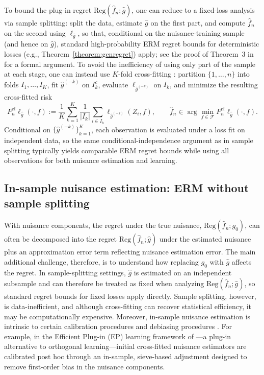 \documentclass[11pt]{article}
\newcommand{\Reg}{\mathrm{Reg}}
\theoremstyle{plain}
\theoremstyle{definition} %
\begin{document}
To bound the plug-in regret \(\Reg(\hat f_n;\hat g)\), one can reduce to a fixed-loss
analysis via sample splitting: split the data, estimate \(\hat g\) on the first
part, and compute \(\hat f_n\) on the second using \(\ell_{\hat g}\), so that,
conditional on the nuisance-training sample (and hence on \(\hat g\)), standard
high-probability ERM regret bounds for deterministic losses (e.g.,
Theorem~\ref{theorem:genregret}) apply; see the proof of Theorem~3 in
\cite{foster2023orthogonal} for a formal argument.  To avoid the inefficiency of using only
part of the sample at each stage, one can instead use $K$-fold cross-fitting
\citep{van2011cross, chernozhukov2018double}: partition $\{1,\ldots,n\}$ into
folds $I_1,\ldots,I_K$, fit $\hat g^{(-k)}$ on $I_k^c$, evaluate
$\ell_{\hat g^{(-k)}}$ on $I_k$, and minimize the resulting cross-fitted risk
\[
P_n^{\mathrm{cf}}\ell_{\hat g}(\cdot,f)
:=
\frac{1}{K}\sum_{k=1}^K \frac{1}{|I_k|}\sum_{i\in I_k} \ell_{\hat g^{(-k)}}(Z_i,f),
\qquad
\hat f_n \in \arg\min_{f\in\mathcal{F}} P_n^{\mathrm{cf}}\ell_{\hat g}(\cdot,f).
\]
Conditional on $\{\hat g^{(-k)}\}_{k=1}^K$, each observation is evaluated under a
loss fit on independent data, so the same conditional-independence argument as
in sample splitting typically yields comparable ERM regret bounds while using
all observations for both nuisance estimation and learning.


\subsection{In-sample nuisance estimation: ERM without sample splitting}
\label{sec:insample}
With nuisance components, the regret under the true nuisance,
\(\Reg(\hat f_n; g_0)\), can often be decomposed into the regret
\(\Reg(\hat f_n;\hat g)\) under the estimated nuisance plus an approximation
error term reflecting nuisance estimation error. The main additional challenge,
therefore, is to understand how replacing \(g_0\) with \(\hat g\) affects the
regret. In sample-splitting settings, \(\hat g\) is estimated on an independent
subsample and can therefore be treated as fixed when analyzing
\(\Reg(\hat f_n;\hat g)\), so standard regret bounds for fixed losses apply
directly. Sample splitting, however, is data-inefficient, and although
cross-fitting can recover statistical efficiency, it may be computationally
expensive. Moreover, in-sample nuisance estimation is intrinsic to certain
calibration procedures \citep{van2024stabilized, van2024doubly} and debiasing
procedures \citep{van2024combining}. For example, in the Efficient Plug-in (EP)
learning framework of \cite{van2024combining}---a plug-in alternative to
orthogonal learning---initial cross-fitted nuisance estimators are calibrated
post hoc through an in-sample, sieve-based adjustment designed to remove
first-order bias in the nuisance components.
\end{document}
